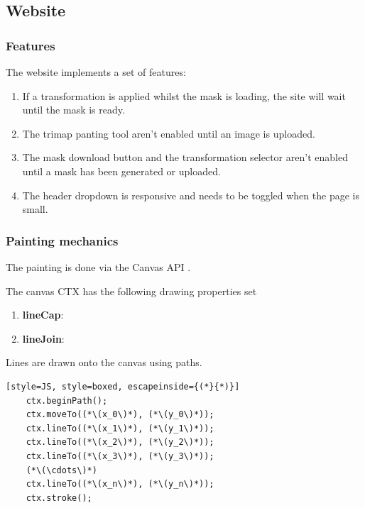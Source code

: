 \documentclass[a4paper]{article}
\begin{document}
\pagebreak

\subsection{Website}

\subsubsection{Features}

The website implements a set of features:
\begin{enumerate}
    \item If a transformation is applied whilst the mask is loading,
    the site will wait until the mask is ready.
    \item The trimap panting tool aren't enabled until an image is uploaded.
    \item The mask download button and the transformation
    selector aren't enabled until a mask has been generated or uploaded.
    \item The header dropdown is responsive and needs to be toggled when the page
    is small.
\end{enumerate}


\pagebreak

\subsubsection{Painting mechanics}

The painting is done via the Canvas API \cite{canvasapi}.

The canvas CTX has the following drawing properties set
\begin{enumerate}
    \item \textbf{lineCap}: 
    \item \textbf{lineJoin}: 
\end{enumerate}

Lines are drawn onto the canvas using paths.
\begin{lstlisting}[style=JS, style=boxed, escapeinside={(*}{*)}]
    ctx.beginPath();
    ctx.moveTo((*\(x_0\)*), (*\(y_0\)*));
    ctx.lineTo((*\(x_1\)*), (*\(y_1\)*));
    ctx.lineTo((*\(x_2\)*), (*\(y_2\)*));
    ctx.lineTo((*\(x_3\)*), (*\(y_3\)*));
    (*\(\cdots\)*)
    ctx.lineTo((*\(x_n\)*), (*\(y_n\)*));
    ctx.stroke();
\end{lstlisting}
\end{document}
